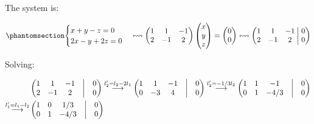 \documentclass[
  letterpaper,
  DIV=11,
  numbers=noendperiod]{scrartcl}
\theoremstyle{definition}
\theoremstyle{remark}
\begin{document}
The system is:

\begin{equation}\phantomsection\label{eq-many_1}{
\begin{cases}
x+y-z=0\\
2x-y+2z = 0\\
\end{cases}
\leftrightsquigarrow
\begin{pmatrix}
1 & 1 & -1\\
2 & -1 & 2\\
\end{pmatrix}
\begin{pmatrix}
x\\
y\\
z
\end{pmatrix}
=
\begin{pmatrix}
0\\
0
\end{pmatrix}
\leftrightsquigarrow
\left(
\begin{matrix}
1 & 1 & -1\\
2 & -1 & 2 \\
\end{matrix}
\;\middle|\;
\begin{matrix}
0\\0
\end{matrix}
\right)
}\end{equation}

Solving:

\[
\begin{align}
&\begin{pmatrix}1 & 1 & -1 &\bigm| & 0\\2 & -1 & 2 &\bigm| & 0\\\end{pmatrix}
\overset{l_2'=l_2-2l_1}{\longrightarrow}
\begin{pmatrix}1 & 1 & -1 &\bigm| & 0\\0 & -3 & 4 &\bigm| & 0\end{pmatrix} 
\overset{l_2'=-1/3l_2}{\longrightarrow}
\begin{pmatrix}1 & 1 & -1 &\bigm| & 0\\0 & 1 & -4/3 &\bigm| & 0\end{pmatrix}\\
\overset{l_1'=l_1-l_2}{\longrightarrow}
&\begin{pmatrix}1 & 0 & 1/3 &\bigm| & 0\\0 & 1 & -4/3 &\bigm| & 0\end{pmatrix} 
\end{align}
\]
\end{document}
